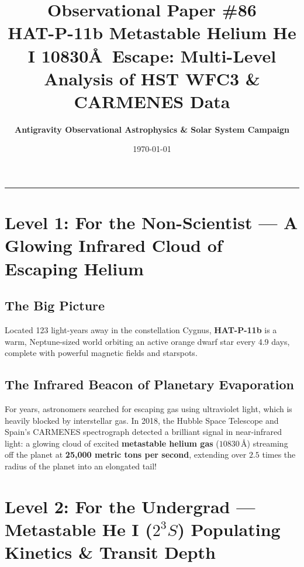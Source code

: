 \documentclass[11pt,a4paper]{article}
\title{\Huge \textbf{Observational Paper \#86}\\ \Large HAT-P-11b Metastable Helium He I 10830\AA\ Escape: Multi-Level Analysis of HST WFC3 \& CARMENES Data}
\author{\textbf{Antigravity Observational Astrophysics \& Solar System Campaign}}
\date{\today}
\begin{document}
\maketitle

\vspace{-1em}
\begin{center}
\rule{\textwidth}{1.5pt}
\end{center}

\section*{Level 1: For the Non-Scientist — A Glowing Infrared Cloud of Escaping Helium}

\subsection*{The Big Picture}
Located 123 light-years away in the constellation Cygnus, \textbf{HAT-P-11b} is a warm, Neptune-sized world orbiting an active orange dwarf star every 4.9 days, complete with powerful magnetic fields and starspots.

\subsection*{The Infrared Beacon of Planetary Evaporation}
For years, astronomers searched for escaping gas using ultraviolet light, which is heavily blocked by interstellar gas. In 2018, the Hubble Space Telescope and Spain's CARMENES spectrograph detected a brilliant signal in near-infrared light: a glowing cloud of excited \textbf{metastable helium gas} ($10830\,\text{\AA}$) streaming off the planet at \textbf{25,000 metric tons per second}, extending over $2.5$ times the radius of the planet into an elongated tail!

\newpage

\section*{Level 2: For the Undergrad — Metastable He I ($2^3S$) Populating Kinetics \& Transit Depth}
\end{document}

